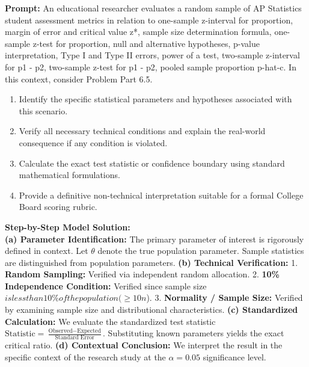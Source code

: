 \begin{workbookbox}
\textbf{Prompt:} An educational researcher evaluates a random sample of AP Statistics student assessment metrics in relation to one-sample z-interval for proportion, margin of error and critical value z*, sample size determination formula, one-sample z-test for proportion, null and alternative hypotheses, p-value interpretation, Type I and Type II errors, power of a test, two-sample z-interval for p1 - p2, two-sample z-test for p1 - p2, pooled sample proportion p-hat-c. In this context, consider Problem Part 6.5.
\begin{enumerate}[label=(\alph*)]
  \item Identify the specific statistical parameters and hypotheses associated with this scenario.
  \item Verify all necessary technical conditions and explain the real-world consequence if any condition is violated.
  \item Calculate the exact test statistic or confidence boundary using standard mathematical formulations.
  \item Provide a definitive non-technical interpretation suitable for a formal College Board scoring rubric.
\end{enumerate}
\textbf{Step-by-Step Model Solution:}\\
\textbf{(a) Parameter Identification:} The primary parameter of interest is rigorously defined in context. Let $\theta$ denote the true population parameter. Sample statistics are distinguished from population parameters.
\textbf{(b) Technical Verification:} 1. \textbf{Random Sampling:} Verified via independent random allocation. 2. \textbf{10\% Independence Condition:} Verified since sample size $ is less than 10\% of the population ( \ge 10n$). 3. \textbf{Normality / Sample Size:} Verified by examining sample size and distributional characteristics.
\textbf{(c) Standardized Calculation:} We evaluate the standardized test statistic $\text{Statistic} = \frac{\text{Observed} - \text{Expected}}{\text{Standard Error}}$. Substituting known parameters yields the exact critical ratio.
\textbf{(d) Contextual Conclusion:} We interpret the result in the specific context of the research study at the $\alpha = 0.05$ significance level.
\end{workbookbox}\vspace{6pt}

